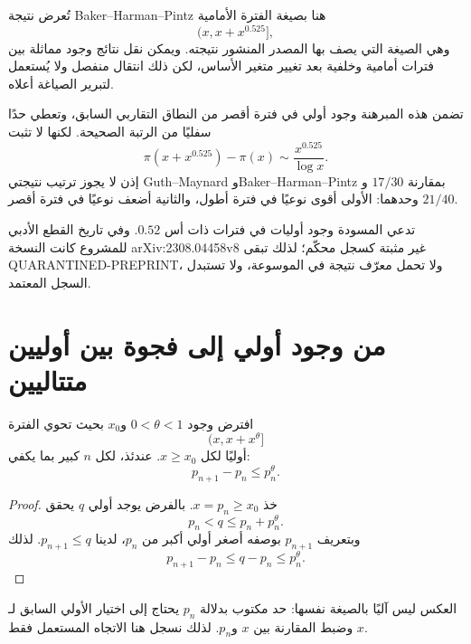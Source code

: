 \begin{remark}
تُعرض نتيجة Baker--Harman--Pintz هنا بصيغة الفترة الأمامية
\[
(x,x+x^{0.525}],
\]
وهي الصيغة التي يصف بها المصدر المنشور نتيجته. ويمكن نقل نتائج وجود
مماثلة بين فترات أمامية وخلفية بعد تغيير متغير الأساس، لكن ذلك انتقال
منفصل ولا يُستعمل لتبرير الصياغة أعلاه.
\end{remark}

تضمن هذه المبرهنة وجود أولي في فترة أقصر من النطاق التقاربي السابق، وتعطي حدًا سفليًا من الرتبة الصحيحة. لكنها لا تثبت
\[
\pi(x+x^{0.525})-\pi(x)
\sim
\frac{x^{0.525}}{\log x}.
\]
إذن لا يجوز ترتيب نتيجتي Guth--Maynard وBaker--Harman--Pintz بمقارنة \(17/30\) و\(21/40\) وحدهما: الأولى أقوى نوعيًا في فترة أطول، والثانية أضعف نوعيًا في فترة أقصر.

\begin{remark}[ادعاء \(0.52\)]
تدعي المسودة \cite{LiShortIntervalsPreprint} وجود أوليات في فترات ذات أس \(0.52\). وفي تاريخ القطع الأدبي للمشروع كانت النسخة \textenglish{arXiv:2308.04458v8} غير مثبتة كسجل محكّم؛ لذلك تبقى \textenglish{QUARANTINED-PREPRINT}، ولا تحمل معرّف نتيجة في الموسوعة، ولا تستبدل السجل المعتمد.
\end{remark}

\section{من وجود أولي إلى فجوة بين أوليين متتاليين}

\begin{corollary}
\label{cor:short-interval-to-prime-gap}
\provedhere
افترض وجود \(0<\theta<1\) و\(x_0\) بحيث تحوي الفترة
\[
(x,x+x^\theta]
\]
أوليًا لكل \(x\ge x_0\). عندئذ، لكل \(n\) كبير بما يكفي:
\[
p_{n+1}-p_n\le p_n^\theta.
\]
\end{corollary}

\begin{proof}
خذ \(x=p_n\ge x_0\). بالفرض يوجد أولي \(q\) يحقق
\[
p_n<q\le p_n+p_n^\theta.
\]
وبتعريف \(p_{n+1}\) بوصفه أصغر أولي أكبر من \(p_n\)، لدينا \(p_{n+1}\le q\). لذلك
\[
p_{n+1}-p_n
\le q-p_n
\le p_n^\theta.
\]
\end{proof}

\begin{remark}
العكس ليس آليًا بالصيغة نفسها: حد مكتوب بدلالة \(p_n\) يحتاج إلى اختيار الأولي السابق لـ\(x\) وضبط المقارنة بين \(x\) و\(p_n\). لذلك نسجل هنا الاتجاه المستعمل فقط.
\end{remark}

